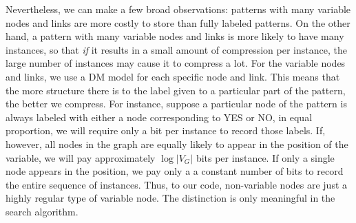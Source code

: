 \documentclass[11pt]{article}
\begin{document}
Nevertheless, we can make a few broad observations: patterns with many variable nodes and links are more costly to store than fully labeled patterns. On the other hand, a pattern with many variable nodes and links is more likely to have many instances, so that \emph{if} it results in a small amount of compression per instance, the large number of instances may cause it to compress a lot. For the variable nodes and links, we use a DM model for each specific node and link. This means that the more structure there is to the label given to a particular part of the pattern, the better we compress. For instance, suppose a particular node of the pattern is always labeled with either a node corresponding to YES or NO, in equal proportion, we will require only a bit per instance to record those labels. If, however, all nodes in the graph are equally likely to appear in the position of the variable, we will pay approximately $\log |V_G|$ bits per instance. If only a single node appears in the position, we pay only a a constant number of bits to record the entire sequence of instances. Thus, to our code, non-variable nodes are just a highly regular type of variable node. The distinction is only meaningful in the search algorithm.
\end{document}
